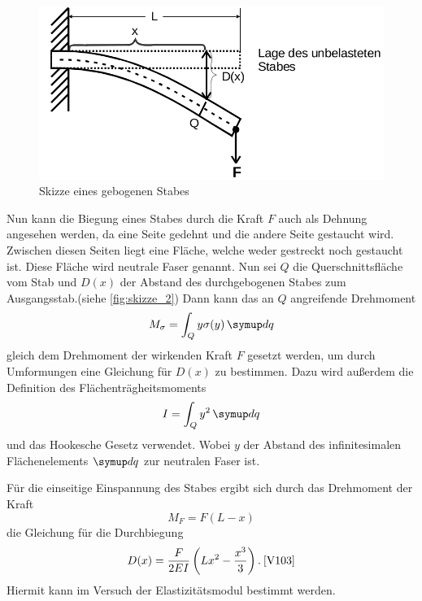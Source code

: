 \begin{figure}
    \centering
    \includegraphics[width=\textwidth/2]{images/skizze_2.png}
    \caption{Skizze eines gebogenen Stabes\cite{V103}}
    \label{fig:skizze_2}
\end{figure}
Nun kann die Biegung eines Stabes durch die Kraft $F$ auch als Dehnung angesehen werden, da eine Seite gedehnt und die andere Seite gestaucht wird.
Zwischen diesen Seiten liegt eine Fläche, welche weder gestreckt noch gestaucht ist.
Diese Fläche wird neutrale Faser genannt. Nun sei $Q$ die Querschnittsfläche vom Stab und $D(x)$ der Abstand des durchgebogenen Stabes zum Ausgangsstab.(siehe \autoref{fig:skizze_2})
Dann kann das an $Q$ angreifende Drehmoment
\begin{equation}
    M_\sigma = \int_Q y\sigma(y)\dif{q}
    \label{eq:drehmoment_sigma}
\end{equation}
gleich dem Drehmoment der wirkenden Kraft $F$ gesetzt werden, um durch Umformungen eine Gleichung für $D(x)$ zu bestimmen.
Dazu wird außerdem die Definition des Flächenträgheitsmoments
\begin{equation}
    I = \int_Q y^2 \dif{q}
    \label{eq:flächentragheitsmoment}
\end{equation}
und das Hookesche Gesetz verwendet. Wobei $y$ der Abstand des infinitesimalen Flächenelements $\dif{q}$ zur neutralen Faser ist.

Für die einseitige Einspannung des Stabes ergibt sich durch das Drehmoment der Kraft
\begin{equation}
    M_F = F (L-x)
    \label{eq:drehmoment_einseitig}
\end{equation}
die Gleichung für die Durchbiegung
\begin{equation}
    D(x) = \frac{F}{2EI} \left( Lx^2 - \frac{x^3}{3} \right). \: \text{\cite{V103}}
    \label{eq:durchbiegung_einseitig}
\end{equation}
Hiermit kann im Versuch der Elastizitätsmodul bestimmt werden.


